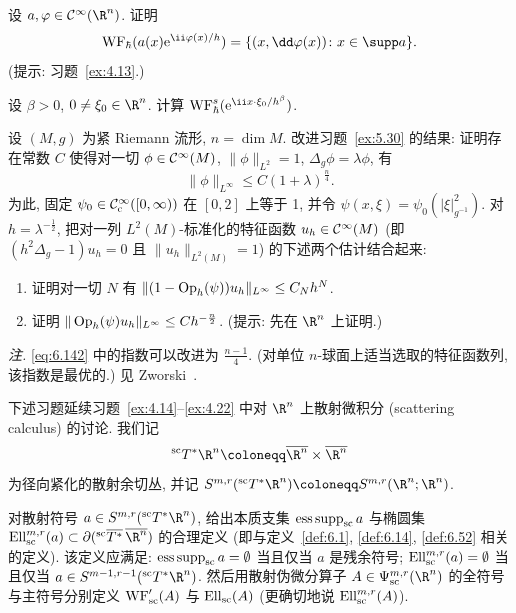 \begin{exer}[振荡分布, I]\label{ex:6.24}
设 $a, \varphi \in \Smooth(\R^n)$. 证明
\begin{equation}\label{eq:6.141}
    \WF_{\hbar}(a(x)\ee^{\ii\varphi(x)/h}) = \{(x, \dd\varphi(x)) \colon x \in \supp a\}.
\end{equation}
(提示: 习题~\ref{ex:4.13}.)
\end{exer}

\begin{exer}[振荡分布, II]\label{ex:6.25}
设 $\beta > 0$, $0 \neq \xi_0 \in \R^n$. 计算 $\WF^s_{\hbar}(\ee^{\ii x \cdot \xi_0/h^\beta})$.
\end{exer}

\begin{exer}[特征函数的粗糙估计]\label{ex:6.26}
设 $(M, g)$ 为紧 Riemann 流形, $n = \dim M$. 改进习题~\ref{ex:5.30} 的结果: 证明存在常数 $C$ 使得对一切 $\phi \in \mathcal{C}^\infty(M)$, $\|\phi\|_{L^2} = 1$, $\Delta_g\phi = \lambda\phi$, 有
\begin{equation}\label{eq:6.142}
    \|\phi\|_{L^\infty} \le C(1 + \lambda)^{\frac{n}{4}}.
\end{equation}
为此, 固定 $\psi_0 \in \mathcal{C}_{\mathrm{c}}^\infty([0, \infty))$ 在 $[0,2]$ 上等于 1, 并令 $\psi(x, \xi) = \psi_0(|\xi|^2_{g^{-1}})$. 对 $h = \lambda^{-\frac12}$, 把对一列 $L^2(M)$-标准化的特征函数 $u_h \in \mathcal{C}^\infty(M)$ (即 $(h^2\Delta_g - 1)u_h = 0$ 且 $\|u_h\|_{L^2(M)} = 1$) 的下述两个估计结合起来:
\begin{enumerate}
    \item 证明对一切 $N$ 有 $\|(1 - \operatorname{Op}_h(\psi))u_h\|_{L^\infty} \le C_N h^N$.
    \item 证明 $\|\operatorname{Op}_h(\psi)u_h\|_{L^\infty} \le C h^{-\frac{n}{2}}$. (提示: 先在 $\R^n$ 上证明.)
\end{enumerate}
\emph{注.} \eqref{eq:6.142} 中的指数可以改进为 $\frac{n-1}{4}$. (对单位 $n$-球面上适当选取的特征函数列, 该指数是最优的.) 见 Zworski~\cite[第 7.4 章]{Zwo12}.
\end{exer}

下述习题延续习题~\ref{ex:4.14}--\ref{ex:4.22} 中对 $\R^n$ 上散射微积分 (scattering calculus) 的讨论. 我们记
\begin{equation}\label{eq:6.143}
    {}^{\mathrm{sc}}T^* \R^n \defeq \overline{\R^n} \times \overline{\R^n}
\end{equation}
为径向紧化的散射余切丛, 并记 $S^{m,r}({}^{\mathrm{sc}}T^* \R^n) \defeq S^{m,r}(\R^n; \R^n)$.

\begin{exer}\label{ex:6.27}
对散射符号 $a \in S^{m,r}({}^{\mathrm{sc}}T^* \R^n)$, 给出本质支集 $\operatorname{ess\,supp}_{\mathrm{sc}} a$ 与椭圆集 $\Ell^{m,r}_{\mathrm{sc}}(a) \subset \partial({}^{\mathrm{sc}}\overline{T^*}\,\overline{\R^n})$ 的合理定义 (即与定义~\ref{def:6.1}, \ref{def:6.14}, \ref{def:6.52} 相关的定义). 该定义应满足: $\operatorname{ess\,supp}_{\mathrm{sc}} a = \emptyset$ 当且仅当 $a$ 是残余符号; $\operatorname{Ell}^{m,r}_{\mathrm{sc}}(a) = \emptyset$ 当且仅当 $a \in S^{m-1,r-1}({}^{\mathrm{sc}}T^* \R^n)$. 然后用散射伪微分算子 $A \in \Psi^{m,r}_{\mathrm{sc}}(\R^n)$ 的全符号与主符号分别定义 $\operatorname{WF}'_{\mathrm{sc}}(A)$ 与 $\operatorname{Ell}_{\mathrm{sc}}(A)$ (更确切地说 $\operatorname{Ell}^{m,r}_{\mathrm{sc}}(A)$).
\end{exer}


